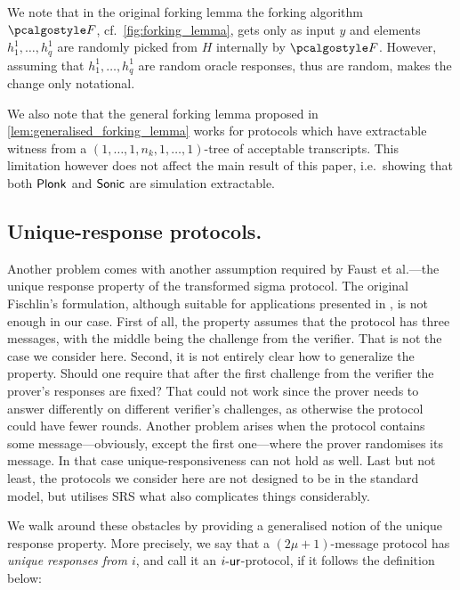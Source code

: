 \documentclass[runningheads,11pt]{llncs}
\theoremstyle{definition} \newtheorem{definition}[theorem]{Definition}
\begin{document}
We note that in the original forking lemma the forking algorithm $\forking$,
cf.~\cref{fig:forking_lemma}, gets only as input $y$ and elements $h^1_1, \ldots,
h^1_q$ are randomly picked from $H$ internally by $\forking$. However, assuming
that $h^1_1, \ldots, h^1_q$ are random oracle responses, thus are random, makes
the change only notational.

We also note that the general forking lemma proposed in
\cref{lem:generalised_forking_lemma} works for protocols which have extractable
witness from a $(1, \ldots, 1, n_k, 1, \ldots, 1)$-tree of acceptable
transcripts. This limitation however does not affect the main result of this
paper, i.e.~showing that both $\textnormal{\textsf{Plonk}}$ and ${\textnormal{\textsf{Sonic}}}$ are simulation extractable.

\subsection{Unique-response protocols.}
Another problem comes with another assumption required by Faust et al.---the
unique response property of the transformed sigma protocol. The original
Fischlin's formulation, although suitable for applications presented in
\cite{C:Fischlin05,INDOCRYPT:FKMV12}, is not enough in our case. First of all,
the property assumes that the protocol has three messages, with the middle being
the challenge from the verifier. That is not the case we consider here. Second,
it is not entirely clear how to generalize the property. Should one require that
after the first challenge from the verifier the prover's responses are fixed?
That could not work since the prover needs to answer differently on different
verifier's challenges, as otherwise the protocol could have fewer
rounds. Another problem arises when the protocol contains some
message---obviously, except the first one---where the prover randomises its
message. In that case unique-responsiveness can not hold as well. Last but not
least, the protocols we consider here are not designed to be in the standard
model, but utilises SRS what also complicates things considerably.

We walk around these obstacles by providing a generalised notion of the unique
response property. More precisely, we say that a $(2\mu + 1)$-message protocol
has \emph{unique responses from $i$}, and call it an ${i\text{-}\mathsf{ur}}$-protocol, if it
follows the definition below:
\end{document}
